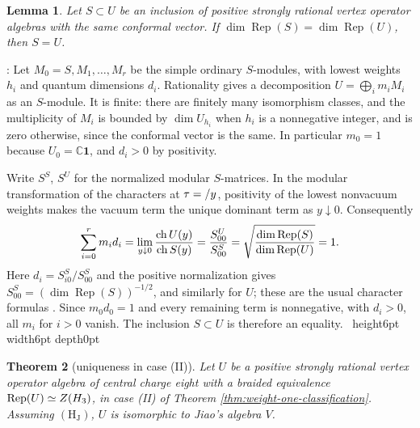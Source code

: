 \documentclass[leqno]{article}
\newcommand{\Cbb}{\ensuremath{\mathbb{C}}}
\let\cal\relax
\newcommand{\cal}{\mathcal}
\newcommand{\qed}{\hfill \vrule height6pt  width6pt depth0pt}
\let\i\relax
\newcommand{\i}{\mathrm{i}}
\DeclareMathOperator{\Rep}{Rep}
\newtheorem{thm}{Theorem}[section]
\newtheorem{lemma}[thm]{Lemma}
\newenvironment{proof}[1][]{\noindent {\it Proof #1} : }{\hbox{~}\qed
\smallskip
}
\numberwithin{equation}{section}
\begin{document}
\begin{lemma}
\label{lem:equal-global-dimension}
Let $S \subset U$ be an inclusion of positive strongly rational vertex operator algebras with the same conformal vector. If $\dim\Rep(S) = \dim\Rep(U)$, then $S = U$.
\end{lemma}

\begin{proof}
Let $M_0 = S,M_1,\ldots,M_r$ be the simple ordinary $S$-modules, with lowest weights $h_i$ and quantum dimensions $d_i$. Rationality gives a decomposition $U = \bigoplus_i m_iM_i$ as an $S$-module. It is finite: there are finitely many isomorphism classes, and the multiplicity of $M_i$ is bounded by $\dim U_{h_i}$ when $h_i$ is a nonnegative integer, and is zero otherwise, since the conformal vector is the same. In particular $m_0 = 1$ because $U_0 = \Cbb\mathbf 1$, and $d_i > 0$ by positivity.

Write $S^S$, $S^U$ for the normalized modular $S$-matrices. In the modular transformation of the characters at $\tau = \i/y$, positivity of the lowest nonvacuum weights makes the vacuum term the unique dominant term as $y \downarrow 0$. Consequently
\[
\sum_{i=0}^r m_i d_i
= \lim_{y \downarrow 0}\frac{\operatorname{ch}U(\i y)}{\operatorname{ch}S(\i y)}
= \frac{S^U_{00}}{S^S_{00}}
= \sqrt{\frac{\dim\Rep(S)}{\dim\Rep(U)}}
= 1.
\]
Here $d_i = S^S_{i0}/S^S_{00}$ and the positive normalization gives $S^S_{00} = (\dim\Rep(S))^{-1/2}$, and similarly for $U$; these are the usual character formulas \cite{Hua08,DJX13}. Since $m_0d_0 = 1$ and every remaining term is nonnegative, with $d_i > 0$, all $m_i$ for $i > 0$ vanish. The inclusion $S \subset U$ is therefore an equality.
\end{proof}

\begin{thm}[uniqueness in case (II)]
\label{thm:uniqueness-two}
Let $U$ be a positive strongly rational vertex operator algebra of central charge eight with a braided equivalence $\Rep(U) \simeq Z(\cal H_3)$, in case (II) of Theorem \ref{thm:weight-one-classification}. Assuming $\mathrm{(H_J)}$, $U$ is isomorphic to Jiao's algebra $V$.
\end{thm}
\end{document}
